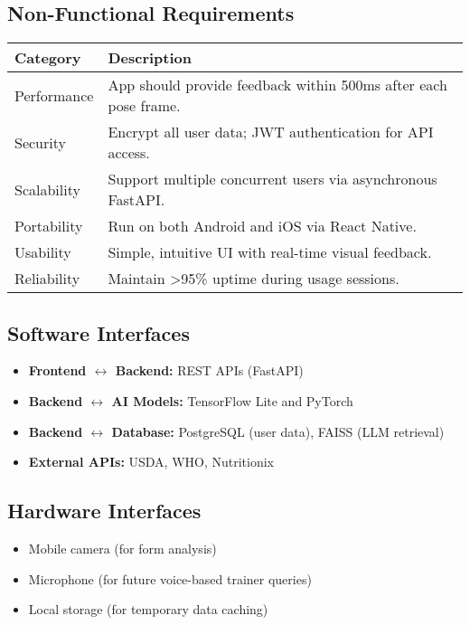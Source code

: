 \documentclass[12pt,a4paper]{article}
\begin{document}
\subsection{Non-Functional Requirements}
\begin{table}[h!]
\centering
\begin{tabular}{>{\raggedright\arraybackslash}p{3cm}>{\raggedright\arraybackslash}p{10cm}}
\toprule
\textbf{Category} & \textbf{Description} \\
\midrule
Performance & App should provide feedback within 500ms after each pose frame. \\
Security & Encrypt all user data; JWT authentication for API access. \\
Scalability & Support multiple concurrent users via asynchronous FastAPI. \\
Portability & Run on both Android and iOS via React Native. \\
Usability & Simple, intuitive UI with real-time visual feedback. \\
Reliability & Maintain >95\% uptime during usage sessions. \\
\bottomrule
\end{tabular}
\end{table}

\subsection{Software Interfaces}
\begin{itemize}[leftmargin=*]
    \item \textbf{Frontend $\leftrightarrow$ Backend:} REST APIs (FastAPI)
    \item \textbf{Backend $\leftrightarrow$ AI Models:} TensorFlow Lite and PyTorch
    \item \textbf{Backend $\leftrightarrow$ Database:} PostgreSQL (user data), FAISS (LLM retrieval)
    \item \textbf{External APIs:} USDA, WHO, Nutritionix
\end{itemize}

\subsection{Hardware Interfaces}
\begin{itemize}[leftmargin=*]
    \item Mobile camera (for form analysis)
    \item Microphone (for future voice-based trainer queries)
    \item Local storage (for temporary data caching)
\end{itemize}
\end{document}
